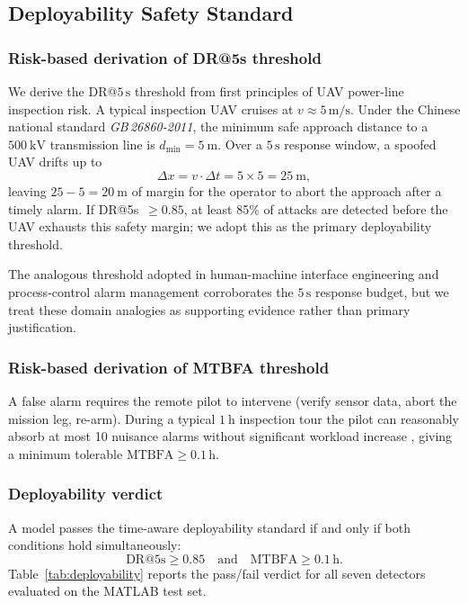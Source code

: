 
\subsection{Deployability Safety Standard}
\label{sec:deployability_standard}

\subsubsection{Risk-based derivation of DR@5s threshold}

We derive the DR@$5\,\text{s}$ threshold from first principles of UAV
power-line inspection risk.
A typical inspection UAV cruises at $v \approx 5\,\text{m/s}$.
Under the Chinese national standard \emph{GB\,26860-2011},
the minimum safe approach distance to a $\SI{500}{\kV}$ transmission line is
$d_{\min} = \SI{5}{\metre}$.
Over a $5\,\text{s}$ response window, a spoofed UAV drifts up to
\[
  \Delta x = v \cdot \Delta t = 5 \times 5 = \SI{25}{\metre},
\]
leaving $25 - 5 = \SI{20}{\metre}$ of margin for the operator to abort
the approach after a timely alarm.
If DR@5s~$\geq 0.85$, at least 85\% of attacks are detected before the UAV
exhausts this safety margin; we adopt this as the primary deployability threshold.

The analogous threshold adopted in human-machine interface engineering
\cite{eemua191} and process-control alarm management \cite{iso11064}
corroborates the $5\,\text{s}$ response budget, but we treat these domain
analogies as supporting evidence rather than primary justification.

\subsubsection{Risk-based derivation of MTBFA threshold}

A false alarm requires the remote pilot to intervene (verify sensor data,
abort the mission leg, re-arm).
During a typical $\SI{1}{\hour}$ inspection tour the pilot can reasonably
absorb at most 10 nuisance alarms without significant workload increase
\cite{axelsson2000base,iso11064}, giving a minimum tolerable
$\text{MTBFA} \geq 0.1\,\text{h}$.

\subsubsection{Deployability verdict}

A model passes the time-aware deployability standard if and only if both
conditions hold simultaneously:
\begin{equation}
  \text{DR@5s} \geq 0.85 \quad \text{and} \quad \text{MTBFA} \geq 0.1\,\text{h}.
\end{equation}
Table~\ref{tab:deployability} reports the pass/fail verdict for all seven
detectors evaluated on the MATLAB test set.
